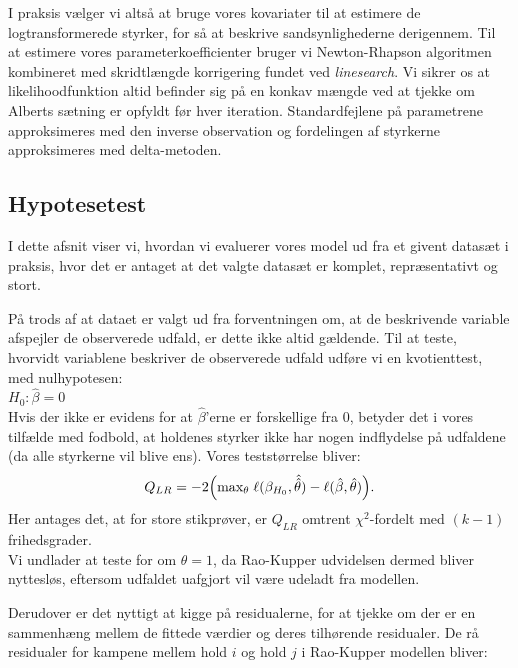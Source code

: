 \documentclass[11pt,a4paper]{article}
\begin{document}
\par
I praksis vælger vi altså at bruge vores kovariater til at estimere de logtransformerede styrker, for så at beskrive sandsynlighederne derigennem. Til at estimere vores parameterkoefficienter bruger vi Newton-Rhapson algoritmen kombineret med skridtlængde korrigering fundet ved \textit{linesearch}\cite{LineSearch}. Vi sikrer os at likelihoodfunktion altid befinder sig på en konkav mængde ved at tjekke om Alberts sætning er opfyldt før hver iteration. Standardfejlene på parametrene approksimeres med den inverse observation og fordelingen af styrkerne approksimeres med delta-metoden.
\subsection{Hypotesetest}
I dette afsnit viser vi, hvordan vi evaluerer vores model ud fra et givent datasæt i praksis, hvor det er antaget at det valgte datasæt er komplet, repræsentativt og stort. \par
På trods af at dataet er valgt ud fra forventningen om, at de beskrivende variable afspejler de observerede udfald, er dette ikke altid gældende. Til at teste, hvorvidt variablene beskriver de observerede udfald udføre vi en kvotienttest, med nulhypotesen:\\
$H_0: \hat{\beta} = 0$\\
Hvis der ikke er evidens for at $\hat{\beta}$'erne er forskellige fra 0, betyder det i vores tilfælde med fodbold, at holdenes styrker ikke har nogen indflydelse på udfaldene (da alle styrkerne vil blive ens). Vores teststørrelse bliver:
\begin{align*}
Q_{LR} = -2\Big{(}\text{max}_\theta \;\ell (\beta_{H_0},\hat{\hat{\theta}})-\ell (\hat{\beta},\hat{\theta})\Big{)}.
\end{align*}
Her antages det, at for store stikprøver, er $Q_{LR}$ omtrent $\chi^2$-fordelt med $(k-1)$ frihedsgrader. \\
Vi undlader at teste for om $\theta=1$, da Rao-Kupper udvidelsen dermed bliver nyttesløs, eftersom udfaldet uafgjort vil være udeladt fra modellen. \par
Derudover er det nyttigt at kigge på residualerne, for at tjekke om der er en sammenhæng mellem de fittede værdier og deres tilhørende residualer. De rå residualer for kampene mellem hold $i$ og hold $j$ i Rao-Kupper modellen bliver:
\end{document}
